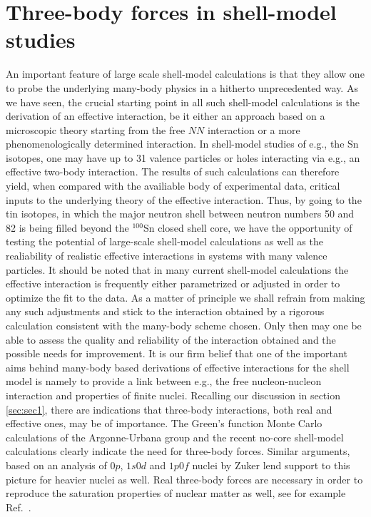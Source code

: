 \documentclass{article}
\begin{document}
\section{Three-body forces in shell-model studies}\label{sec:sec7}

An important feature of large scale shell-model calculations
is that they allow one to probe the underlying many-body
physics in a hitherto unprecedented way.
As we have seen, the crucial starting point in all such shell-model 
calculations is
the derivation of an effective interaction, be it
either an approach based on a microscopic theory
starting from the free $NN$ interaction or a more 
phenomenologically determined interaction. 
In shell-model studies of e.g., the Sn isotopes, one may have
up to 31 valence particles or holes interacting via e.g.,
an effective two-body interaction. The results of such 
calculations can therefore yield, when compared with 
the availiable body of experimental data, critical
inputs to the underlying theory of the effective interaction.
Thus, by going to the
tin isotopes, in which the major neutron shell between neutron numbers 50 and
82 is being filled beyond the $^{100}$Sn closed shell core, we have the opportunity
of testing the potential of large-scale 
shell-model calculations as well as the realiability of
realistic effective interactions in systems with many valence particles. It should
be noted that in many current shell-model calculations the effective interaction
is frequently either parametrized or adjusted in order to optimize the fit to the
data. As a matter of principle we shall refrain from making any such
adjustments and stick to the interaction obtained by a 
rigorous calculation consistent with the many-body scheme chosen. 
Only then may one 
be able to assess the quality and reliability of the interaction 
obtained and the possible
needs for improvement. 
It is our firm belief that 
one of the important  aims  
behind many-body based derivations of effective
interactions for the shell model is namely
to provide a link between e.g., the free
nucleon-nucleon interaction and properties of
finite nuclei. 
Recalling our discussion in section \ref{sec:sec1}, there are indications that
three-body 
interactions, both real and effective ones, may be of
importance. The Green's function Monte Carlo calculations of the Argonne-Urbana
group \cite{bob1,bob2,bob3} and the recent no-core shell-model calculations
\cite{petr_erich2002,petr_erich2003} clearly indicate the need for
three-body forces. Similar arguments, based on an analysis of $0p$, $1s0d$ and $1p0f$
nuclei by Zuker \cite{zuker1} lend support to this picture for heavier nuclei as well.
Real three-body forces are necessary
in order to reproduce the saturation properties of nuclear matter as well, see for example
Ref.~\cite{apr98}.
\end{document}
